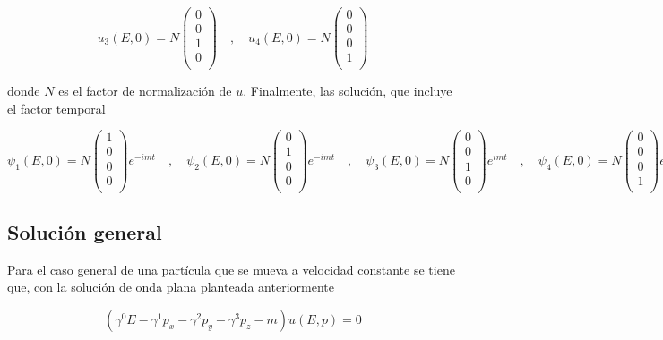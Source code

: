 $$ u_3(E,0) = N\begin{pmatrix}
    0 \\
    0 \\
    1 \\
    0 \\
\end{pmatrix} \quad , \quad u_4(E,0) = N\begin{pmatrix}
    0 \\
    0 \\
    0 \\
    1 \\
\end{pmatrix} $$

donde $N$ es el factor de normalización de $u$. Finalmente, las solución, que incluye el factor temporal

$$ \psi_1(E,0) = N\begin{pmatrix}
1 \\
0 \\
0 \\
0 \\
\end{pmatrix}e^{-imt} \quad , \quad \psi_2(E,0) = N\begin{pmatrix}
0 \\
1 \\
0 \\
0 \\
\end{pmatrix}e^{-imt} \quad , \quad \psi_3(E,0) = N\begin{pmatrix}
0 \\
0 \\
1 \\
0 \\
\end{pmatrix}e^{imt} \quad , \quad	 \psi_4(E,0) = N\begin{pmatrix}
0 \\
0 \\
0 \\
1 \\
\end {pmatrix}e^{imt} $$

\subsection{Solución general}

Para el caso general de una partícula que se mueva a velocidad constante se tiene que, con la solución de onda plana planteada anteriormente

$$ (\gamma^0E - \gamma^1p_x - \gamma^2p_y - \gamma^3p_z - m)u(E,p)= 0 $$

